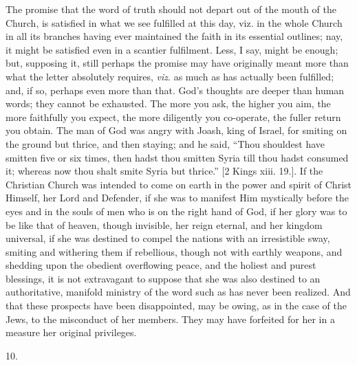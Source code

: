The promise that the word of truth should not depart out of the
mouth of the Church, is satisfied in what we see fulfilled at this
day, viz. in the whole Church in all its branches having ever
maintained the faith in its essential outlines; nay, it might be
satisfied even in a scantier fulfilment. Less, I say, might be enough;
but, supposing it, still perhaps the promise may have originally meant
more than what the letter absolutely requires, \emph{viz}. as much as has
actually been fulfilled; and, if so, perhaps even more than that. God's
thoughts are deeper than human words; they cannot be exhausted. The
more you ask, the higher you aim, the more faithfully you expect, the
more diligently you co-operate, the fuller return you obtain. The man
of God was angry with Joash, king of Israel, for smiting on the ground
but thrice, and then staying; and he said, ``Thou shouldest have
smitten five or six times, then hadst thou smitten Syria till thou
hadst consumed it; whereas now thou shalt smite Syria but
thrice.'' [2 Kings xiii. 19.]. If the Christian Church was
intended to come on earth in the power and spirit of Christ Himself,
her Lord and Defender, if she was to manifest Him mystically before
the eyes and in the souls of men who is on the right hand of God, if
her glory was to be like that of heaven, though invisible, her reign
eternal, and her kingdom universal, if she was destined to compel
the nations with an irresistible sway, smiting and withering
them if rebellious, though not with earthly weapons, and shedding upon
the obedient overflowing peace, and the holiest and purest blessings,
it is not extravagant to suppose that she was also destined to an
authoritative, manifold ministry of the word such as has never been
realized. And that these prospects have been disappointed, may be
owing, as in the case of the Jews, to the misconduct of her members.
They may have forfeited for her in a measure her original privileges.

10.

